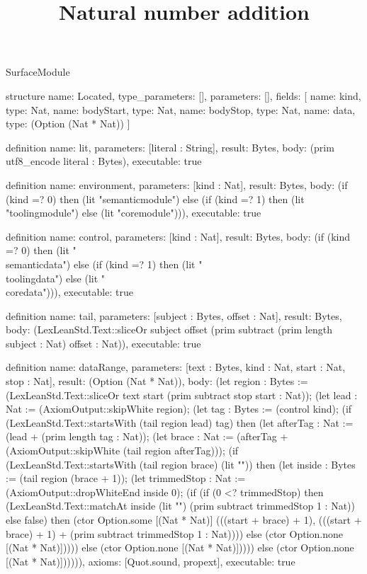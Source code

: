 \begin{lexlean}{SurfaceModule}
\title{Natural number addition}
\begin{semanticmodule}
structure{
  name: Located,
  type_parameters: [],
  parameters: [],
  fields: [
    {name: kind, type: Nat},
    {name: bodyStart, type: Nat},
    {name: bodyStop, type: Nat},
    {name: data, type: (Option (Nat * Nat))}
  ]
}

definition{
  name: lit,
  parameters: [literal : String],
  result: Bytes,
  body: (prim utf8_encode literal : Bytes),
  executable: true
}

definition{
  name: environment,
  parameters: [kind : Nat],
  result: Bytes,
  body: (if (kind =? 0) then (lit "semanticmodule") else (if (kind =? 1) then (lit "toolingmodule") else (lit "coremodule"))),
  executable: true
}

definition{
  name: control,
  parameters: [kind : Nat],
  result: Bytes,
  body: (if (kind =? 0) then (lit "\\semanticdata") else (if (kind =? 1) then (lit "\\toolingdata") else (lit "\\coredata"))),
  executable: true
}

definition{
  name: tail,
  parameters: [subject : Bytes, offset : Nat],
  result: Bytes,
  body: (LexLeanStd.Text::sliceOr subject offset (prim subtract (prim length subject : Nat) offset : Nat)),
  executable: true
}

definition{
  name: dataRange,
  parameters: [text : Bytes, kind : Nat, start : Nat, stop : Nat],
  result: (Option (Nat * Nat)),
  body: (let region : Bytes := (LexLeanStd.Text::sliceOr text start (prim subtract stop start : Nat)); (let lead : Nat := (AxiomOutput::skipWhite region); (let tag : Bytes := (control kind); (if (LexLeanStd.Text::startsWith (tail region lead) tag) then (let afterTag : Nat := (lead + (prim length tag : Nat)); (let brace : Nat := (afterTag + (AxiomOutput::skipWhite (tail region afterTag))); (if (LexLeanStd.Text::startsWith (tail region brace) (lit "{")) then (let inside : Bytes := (tail region (brace + 1)); (let trimmedStop : Nat := (AxiomOutput::dropWhiteEnd inside 0); (if (if (0 <? trimmedStop) then (LexLeanStd.Text::matchAt inside (lit "}") (prim subtract trimmedStop 1 : Nat)) else false) then (ctor Option.some [(Nat * Nat)] (((start + brace) + 1), (((start + brace) + 1) + (prim subtract trimmedStop 1 : Nat)))) else (ctor Option.none [(Nat * Nat)])))) else (ctor Option.none [(Nat * Nat)])))) else (ctor Option.none [(Nat * Nat)]))))),
  axioms: [Quot.sound, propext],
  executable: true
}


\end{semanticmodule}
\end{lexlean}
